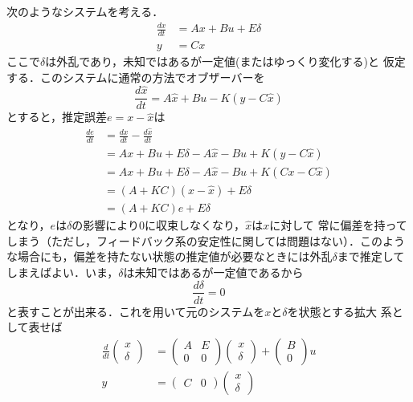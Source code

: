 次のようなシステムを考える．
\begin{align}
 \frac{dx}{dt} &= A x + B u + E \delta \nonumber \\
 y             &= C x
\end{align}
ここで$\delta$は外乱であり，未知ではあるが一定値(またはゆっくり変化する)と
仮定する．このシステムに通常の方法でオブザーバーを
\begin{equation}
 \frac{d \hat{x}}{dt} = A \hat{x} + B u - K(y - C \hat{x})
\end{equation}
とすると，推定誤差$e = x - \hat{x}$は
\begin{align}
 \frac{de}{dt} &= \frac{dx}{dt} - \frac{d\hat{x}}{dt} \nonumber \\
 &= Ax + Bu + E \delta - A\hat{x} - Bu + K(y - C \hat{x}) \nonumber \\
 &= Ax + Bu + E \delta - A\hat{x} - Bu + K(Cx - C \hat{x}) \nonumber  \\
 &= (A+KC)(x-\hat{x}) + E \delta \nonumber \\
 &= (A+KC)e + E \delta
\end{align}
となり，$e$は$\delta$の影響により$0$に収束しなくなり，$\hat{x}$は$x$に対して
常に偏差を持ってしまう（ただし，フィードバック系の安定性に関しては問題はない）．このような場合にも，偏差を持たない状態の推定値が必要なときには外乱$\delta$まで推定してしまえばよい．いま，$\delta$は未知ではあるが一定値であるから
\begin{equation}
 \frac{d \delta}{dt} = 0
\end{equation}
と表すことが出来る．これを用いて元のシステムを$x$と$\delta$を状態とする拡大
系として表せば
\begin{align}
 \frac{d}{dt}
  \left(\begin{array}{c}
         x \\
	 \delta
	\end{array}\right)
  &=
  \left(\begin{array}{cc}
         A & E \\
	 0 & 0
	\end{array}\right)
  \left(\begin{array}{c}
         x \\
	 \delta
	\end{array}\right)
  +
  \left(\begin{array}{c}
         B \\
	 0
	\end{array}\right)
  u \\
 y &=
  \left(\begin{array}{cc}
         C & 0
	\end{array}\right) 
  \left(\begin{array}{c}
	 x \\
	 \delta
	\end{array}\right)
\end{align}
